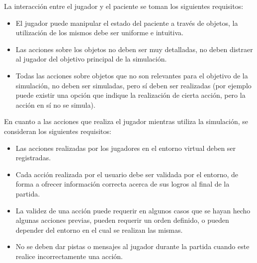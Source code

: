 La interacción entre el jugador y el paciente se toman los siguientes
requisitos:

\begin{itemize}
\item El jugador puede manipular el estado del paciente a través de objetos, la
    utilización de los mismos debe ser uniforme e intuitiva.
\item Las acciones sobre los objetos no deben ser muy detalladas, no deben
    distraer al jugador del objetivo principal de la simulación.
\item Todas las acciones sobre objetos que no son relevantes para el objetivo de
    la simulación, no deben ser simuladas, pero sí deben ser realizadas (por
    ejemplo puede existir una opción que indique la realización de cierta
    acción, pero la acción en sí no se simula).
\end{itemize}

En cuanto a las acciones que realiza el jugador mientras utiliza la simulación,
se consideran los siguientes requisitos:

\begin{itemize}
\item Las acciones realizadas por los jugadores en el entorno virtual deben ser
    registradas.
\item Cada acción realizada por el usuario debe ser validada por el entorno, de
    forma a ofrecer información correcta acerca de sus logros al final de la
    partida.
\item La validez de una acción puede requerir en algunos casos que se hayan
    hecho algunas acciones previas, pueden requerir un orden definido, o pueden
    depender del entorno en el cual se realizan las mismas.
\item No se deben dar pistas o mensajes al jugador durante la partida cuando
    este realice incorrectamente una acción.
\end{itemize}
